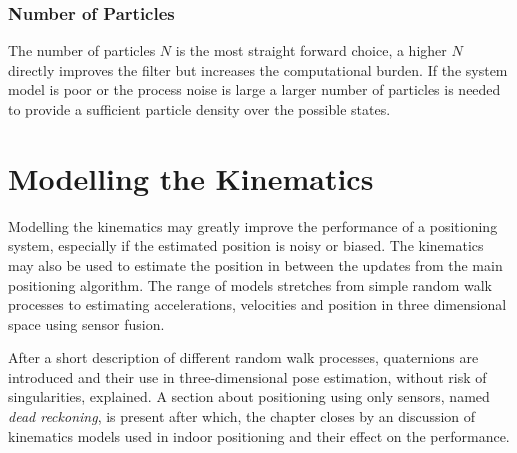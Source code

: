 \documentclass{LTHthesis}
\begin{document}
\subsection{Number of Particles}
%
The number of particles $N$ is the most straight forward choice, a higher $N$ directly improves the filter but increases the computational burden. If the system model is poor or the process noise is large a larger number of particles is needed to provide a sufficient particle density over the possible states.  
%
\chapter{Modelling the Kinematics} %
%
Modelling the kinematics may greatly improve the performance of a positioning system, especially if the estimated position is noisy or biased. The kinematics may also be used to estimate the position in between the updates from the main positioning algorithm. The range of models stretches from simple random walk processes to estimating accelerations, velocities and position in three dimensional space using sensor fusion.

After a short description of different random walk processes, quaternions are introduced and their use in three-dimensional pose  estimation, without risk of singularities, explained. A section about positioning using only sensors, named \emph{dead reckoning}, is present after which, the chapter closes by an discussion of kinematics models used in indoor positioning and their effect on the performance.   
%
\end{document}
